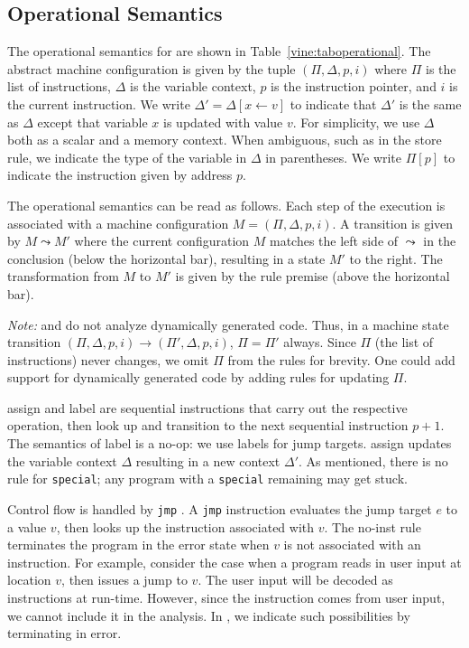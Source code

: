 \subsection{Operational Semantics}
\label{vine:operational}



The operational semantics for \bil are shown in
Table~\ref{vine:taboperational}.  The abstract machine configuration
is given by the tuple $(\Pi, \Delta, p, i)$ where $\Pi$ is the list of
instructions, $\Delta$ is the variable context, $p$ is the instruction
pointer, and $i$ is the current instruction.  We write $\Delta' =
\Delta[x \leftarrow v]$ to indicate that $\Delta'$ is the same as
$\Delta$ except that variable $x$ is updated with value $v$.  For
simplicity, we use $\Delta$ both as a scalar and a memory context. When
ambiguous, such as in the {\sc store} rule, we indicate the type of
the variable in $\Delta$ in parentheses. We write $\Pi[p]$ to indicate
the instruction given by address $p$.

The operational semantics can be read as follows.  Each step of the
execution is associated with a machine configuration $M = (\Pi,
\Delta, p, i)$.  A transition is given by $M \leadsto M'$ where the
current configuration $M$ matches the left side of $\leadsto$ in the
conclusion (below the horizontal bar), resulting in a state $M'$ to
the right.  The transformation from $M$ to $M'$ is given by the rule
premise (above the horizontal bar). 

{\it Note:} \bap and \bil do not analyze dynamically generated
code. Thus, in a machine state transition $(\Pi, \Delta, p, i)
\rightarrow (\Pi', \Delta, p, i)$, $\Pi = \Pi'$ always. Since $\Pi$
(the list of instructions) never changes, we omit $\Pi$ from the rules
for brevity. One could add support for dynamically generated code by
adding rules for updating $\Pi$. 


{\sc assign} and {\sc label} are sequential instructions that carry
out the respective operation, then look up and transition to the next
sequential instruction $p+1$. The semantics of {\sc label} is a no-op:
we use labels for jump targets.  {\sc assign} updates the variable
context $\Delta$ resulting in a new context $\Delta'$.  As mentioned,
there is no rule for {\tt special}; any program with a {\tt special}
remaining may get stuck.

Control flow is handled by {\tt jmp}%
. A {\tt jmp} instruction
evaluates the jump target $e$ to a value $v$, then looks up the
instruction associated with $v$.  The {\sc no-inst} rule terminates
the program in the error state when $v$ is not associated with an
instruction. For example, consider the case when a program reads in
user input at location $v$, then issues a jump to $v$.  The user input
will be decoded as instructions at run-time.  However, since the
instruction comes from user input, we cannot include it in the analysis. In
\bap, we indicate such possibilities by terminating in error.




%
